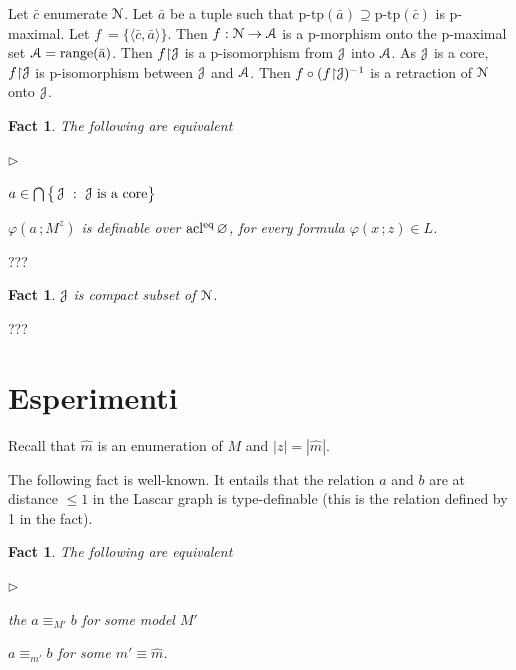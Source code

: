 \documentclass{amsproc}
\makeatletter
\def\A{\EuScript A}
\def\J{\EuScript J}
\def\N{\EuScript N}
\def\phi{\varphi}
\newcommand{\mylabel}[1]{{#1}\hfill}
\renewenvironment{itemize}
  {\begin{list}{$\triangleright$}{%
  \setlength{\parskip}{0mm}
  \setlength{\topsep}{.1\baselineskip}
  \setlength{\rightmargin}{0mm}
  \setlength{\listparindent}{0mm}
  \setlength{\itemindent}{0mm}
  \setlength{\labelwidth}{3ex}
  \setlength{\itemsep}{.1\baselineskip}
  \setlength{\parsep}{.1\baselineskip}
  \setlength{\partopsep}{0mm}
  \setlength{\labelsep}{1ex}
  \setlength{\leftmargin}{\labelwidth+\labelsep}
  \let\makelabel\mylabel}}{%
\end{list}}
\newcounter{thm}
\theoremstyle{mio}
\newtheorem{fact}[thm]{Fact}\tcolorboxenvironment{fact}{mythm}
\providecommand{\proofNameStyle}{\bfseries}
\renewenvironment{proof}[1][\proofname]{\par
  \pushQED{\qed}%
  \normalfont%
  \trivlist
  \item[\hskip\labelsep
        \proofNameStyle
    #1\@addpunct{.}]\ignorespaces
}{%
  \popQED\endtrivlist\@endpefalse
}
\makeatother
\begin{document}
\begin{proof}
  Let $\bar c$ enumerate $\N$.
  Let $\bar a$ be a tuple such that $\textrm{p-tp}(\bar a)\supseteq \textrm{p-tp}(\bar c)$ is p-maximal.
  Let $f\ =\{\langle\bar c,\bar a\rangle\}$.
  Then $f:\N\to\A$ is a p-morphism onto the p-maximal set $\A={\rm range(\bar a)}$.
  Then $f{\restriction}\J$ is a p-isomorphism from $\J$ into $\A$.
  As $\J$ is a core, $f{\restriction}\J$ is p-isomorphism between $\J$ and $\A$.
  Then $f\circ(f{\restriction}\J)^{-1}$ is a retraction of $\N$ onto $\J$.
\end{proof}

\begin{fact}
  The following are equivalent
  \begin{itemize}
    \item[1.] $a\in\bigcap\big\{\,\J\ :\ \J \textrm{ is a core}\big\}$
    \item[2.] $\phi(a\,;M^z)$ is definable over ${\rm acl^{eq}}\,\varnothing$, for every formula $\phi(x\,;z)\in L$.
  \end{itemize} 
\end{fact}

\begin{proof}
  ???
\end{proof}

\begin{fact}
  $\J$ is compact subset of $\N$.
\end{fact}

\begin{proof}
  ???
\end{proof}

\section{Esperimenti}

Recall that $\hat m$ is an enumeration of $M$ and $|z|=|\hat m|$.

The following fact is well-known.
It entails that the relation $a$ and $b$ are at distance $\le1$ in the Lascar graph is type-definable (this is the relation defined by 1 in the fact).

\begin{fact}
  The following are equivalent
  \begin{itemize}
    \item[1.] the $a\equiv_{M'}b$ for some model $M'$
    \item[2.] $a\equiv_{m'}b$ for some $m'\equiv\hat m$.
  \end{itemize}
\end{fact}
\end{document}
